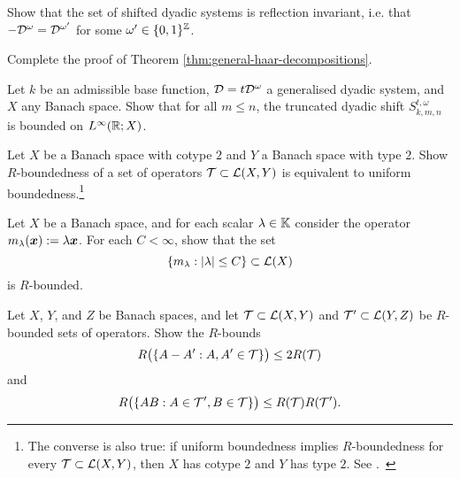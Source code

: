 \begin{exercise}\label{ex:dyadic-refln-invariance}
  Show that the set of shifted dyadic systems is reflection invariant, i.e. that $-\mathcal{D}^{\omega} = \mathcal{D}^{\omega'}$ for some $\omega' \in \{0,1\}^{\mathbb{Z}}$.
\end{exercise}

\begin{exercise}\label{ex:mgale-reduction}
  Complete the proof of Theorem \ref{thm:general-haar-decompositions}.
\end{exercise}

\begin{exercise}
  Let $k$ be an admissible base function, $\mathcal{D} = t\mathcal{D}^{\omega}$ a generalised dyadic system, and $X$ any Banach space.
  Show that for all $m \leq n$, the truncated dyadic shift $S_{k,m,n}^{t,\omega}$ is bounded on $L^\infty(\mathbb{R};X)$.
\end{exercise}

\begin{exercise}\label{ex:R-bound-type}
  Let $X$ be a Banach space with cotype $2$ and $Y$ a Banach space with type $2$.
  Show $R$-boundedness of a set of operators $\mathcal{T} \subset \mathcal{L}(X,Y)$ is equivalent to uniform boundedness.\footnote{The converse is also true: if uniform boundedness implies $R$-boundedness for every $\mathcal{T} \subset \mathcal{L}(X,Y)$, then $X$ has cotype $2$ and $Y$ has type $2$. See \cite[Proposition 8.6.1]{HNVW17}.\ }
\end{exercise}

\begin{exercise}\label{ex:scalars}
  Let $X$ be a Banach space, and for each scalar $\lambda \in \mathbb{K}$ consider the operator $m_{\lambda}(\bm{x}) := \lambda \bm{x}$.
  For each $C < \infty$, show that the set
  \begin{equation*}
    \{m_{\lambda} : |\lambda| \leq C\} \subset \mathcal{L}(X)
  \end{equation*}
  is $R$-bounded.
\end{exercise}

\begin{exercise}\label{ex:R-bound-stuff}
  Let $X$, $Y$, and $Z$ be Banach spaces, and let $\mathcal{T} \subset \mathcal{L}(X,Y)$ and $\mathcal{T}' \subset \mathcal{L}(Y,Z)$ be $R$-bounded sets of operators.
  Show the $R$-bounds
  \begin{equation*}
    R\big(\{A - A' : A,A' \in \mathcal{T}\} \big) \leq 2R(\mathcal{T})
  \end{equation*}
  and
  \begin{equation*}
    R\big(\{AB : A \in \mathcal{T}', B \in \mathcal{T}\}\big) \leq R(\mathcal{T})R(\mathcal{T}').
  \end{equation*}
\end{exercise}


